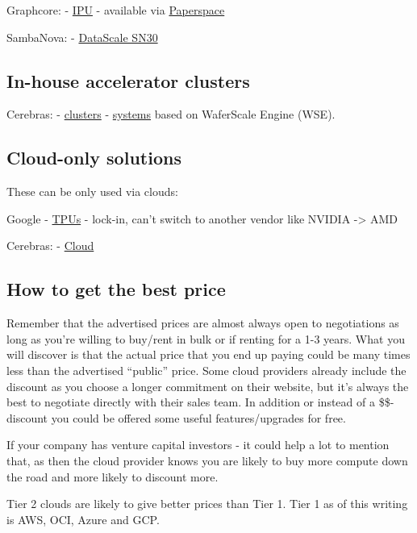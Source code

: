 \documentclass[
]{report}
\begin{document}
Graphcore: - \href{https://www.graphcore.ai/products/ipu}{IPU} -
available via \href{https://www.paperspace.com/graphcore}{Paperspace}

SambaNova: - \href{https://sambanova.ai/products/datascale/}{DataScale
SN30}

\subsection{In-house accelerator
clusters}\label{in-house-accelerator-clusters}

Cerebras: - \href{https://www.cerebras.net/product-cluster/}{clusters} -
\href{https://www.cerebras.net/product-system/}{systems} based on
WaferScale Engine (WSE).

\subsection{Cloud-only solutions}\label{cloud-only-solutions}

These can be only used via clouds:

Google - \href{https://cloud.google.com/tpu}{TPUs} - lock-in, can't
switch to another vendor like NVIDIA -\textgreater{} AMD

Cerebras: - \href{https://www.cerebras.net/product-cloud/}{Cloud}

\subsection{How to get the best price}\label{how-to-get-the-best-price}

Remember that the advertised prices are almost always open to
negotiations as long as you're willing to buy/rent in bulk or if renting
for a 1-3 years. What you will discover is that the actual price that
you end up paying could be many times less than the advertised
``public'' price. Some cloud providers already include the discount as
you choose a longer commitment on their website, but it's always the
best to negotiate directly with their sales team. In addition or instead
of a \$\$-discount you could be offered some useful features/upgrades
for free.

If your company has venture capital investors - it could help a lot to
mention that, as then the cloud provider knows you are likely to buy
more compute down the road and more likely to discount more.

Tier 2 clouds are likely to give better prices than Tier 1. Tier 1 as of
this writing is AWS, OCI, Azure and GCP.
\end{document}
